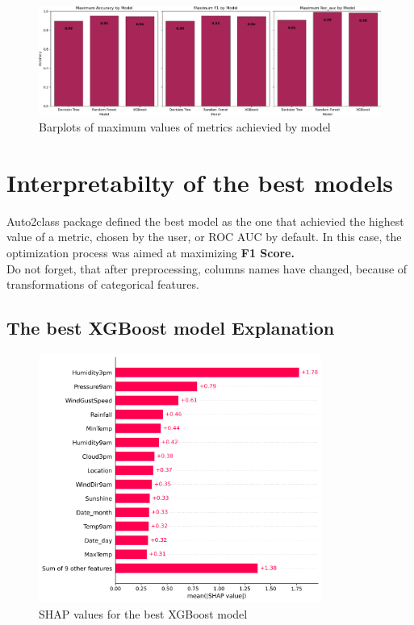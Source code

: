 \documentclass{article}%
\begin{document}
\begin{figure}[h!]%
\centering%
\includegraphics[width=460px]{ModelOptimization/barplots_max_metric.png}%
\caption{Barplots of maximum values of metrics achievied by model}%
\end{figure}

%
\newpage%
\section{Interpretabilty of the best models}%
\label{sec:Interpretabiltyofthebestmodels}%
Auto2class package defined the best model as the one that achievied the highest value of a metric, chosen by the user, or ROC AUC by default.%
In this case, the optimization process was aimed at maximizing%
\textbf{ F1 Score.}%
\\%
Do not forget, that after preprocessing, columns names have changed, because of transformations of categorical features.%
\subsection{The best XGBoost model Explanation}%
\label{subsec:ThebestXGBoostmodelExplanation}%


\begin{figure}[h!]%
\centering%
\includegraphics[width=350px]{XAI/XGBoost/global_feature_importance_shap.png}%
\caption{SHAP values for the best XGBoost model}%
\end{figure}
\end{document}
